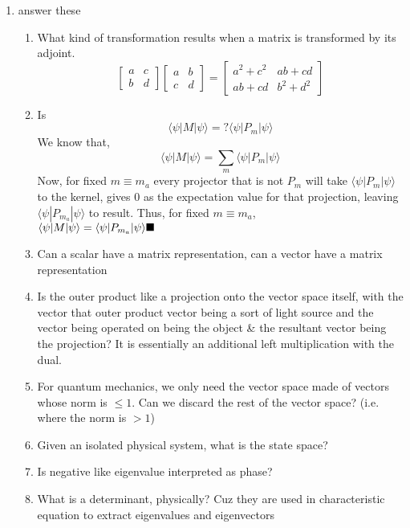 \documentclass{article}
\begin{document}
\begin{enumerate}
\begin{enumerate}
    \end{enumerate}
\item answer these
    \begin{enumerate}
        \item What kind of transformation results when a matrix is transformed by its adjoint. 
$$\left[ \begin{array}{cc} a & c \\ b & d \end{array} \right] \left[ \begin{array}{cc} a & b \\ c & d \end{array} \right] = \left[ \begin{array}{cc} a^2+c^2 & ab+cd \\ ab+cd & b^2+d^2 \end{array} \right] $$ 
        \item Is $$ \langle\psi|M|\psi\rangle = ? \langle\psi|P_m|\psi\rangle$$
             We know that, \\
             $$\langle\psi|M|\psi\rangle = \sum_m \langle\psi|P_m|\psi\rangle $$
            Now, for fixed $ m \equiv m_a $ every projector that is not $P_m$ will take $\langle\psi|P_m|\psi\rangle$ to the kernel, gives 0 as the expectation value for that projection, leaving $\langle\psi|P_{m_a}|\psi\rangle$ to result. Thus, for fixed $ m \equiv m_a $, \\
            $ \langle\psi|M|\psi\rangle = \langle\psi|P_{m_a}|\psi\rangle \\\blacksquare$
        \item Can a scalar have a matrix representation, can a vector have a matrix representation
        
        \item Is the outer product like a projection onto the vector space itself, with the vector that outer product vector being a sort of light source and the vector being operated on being the object \& the resultant vector being the projection? It is essentially an additional left multiplication with the dual.
        \item For quantum mechanics, we only need the vector space made of vectors whose norm is $\le 1$. Can we discard the rest of the vector space? (i.e. where the norm is $> 1$)
        \item Given an isolated physical system, what is the state space?
        \item Is negative like eigenvalue interpreted as phase?
        \item What is a determinant, physically? Cuz they are used in characteristic equation to extract eigenvalues and eigenvectors

    \end{enumerate}

    \end{enumerate}
    
\end{document}
